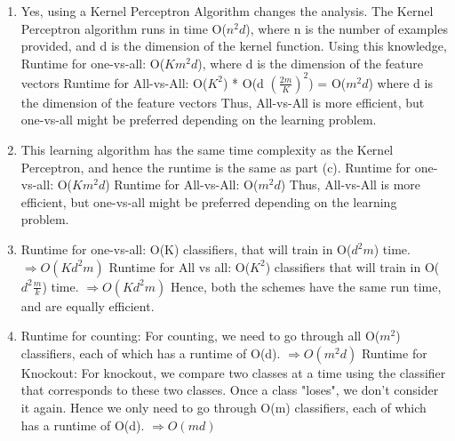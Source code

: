 \documentclass[11pt]{article}
\begin{document}
\begin{enumerate}
\item
Yes, using a Kernel Perceptron Algorithm changes the analysis. The Kernel 
Perceptron algorithm runs in time O($n^2 d$), where n is the number of examples
provided, and d is the dimension of the kernel function. \newline
Using this knowledge, \newline
Runtime for one-vs-all: O($Km^2d$), where d is the dimension of the feature vectors \newline
Runtime for All-vs-All: O($K^2$) * O(d $\left(\frac{2m}{K}\right)^2$) = O($m^2 d$) where d is the dimension of the feature vectors  \newline
Thus, All-vs-All is more efficient, but one-vs-all might be preferred depending on the learning
problem.

\item
This learning algorithm has the same time complexity as the Kernel Perceptron,
and hence the runtime is the same as part (c). \newline
Runtime for one-vs-all: O($Km^2d$) \newline
Runtime for All-vs-All: O($m^2 d$) \newline
Thus, All-vs-All is more efficient, but one-vs-all might be preferred depending on the learning
problem.

\item
Runtime for one-vs-all: O(K) classifiers, that will train in O($d^2m$) time. $\Rightarrow O(Kd^2m)$ \newline
Runtime for All vs all: O($K^2$) classifiers that will train in O($d^2 \frac{m}{k}$) time. $\Rightarrow O(Kd^2m)$ \newline
Hence, both the schemes have the same run time, and are equally efficient.

\item
Runtime for counting: For counting, we need to go through all O($m^2$) classifiers, each of which has 
a runtime of O(d). $\Rightarrow O(m^2 d)$ \newline
Runtime for Knockout: For knockout, we compare two classes at a time using the classifier that corresponds
to these two classes. Once a class "loses", we don't consider it again. Hence we only need to go through
O(m) classifiers, each of which has a runtime of O(d).
$\Rightarrow O(md)$
\end{enumerate}
\end{document}
